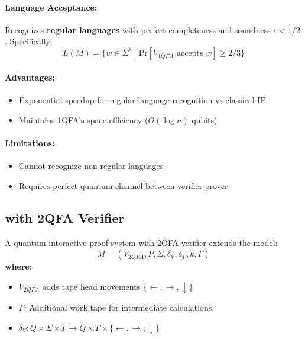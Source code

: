 \paragraph{Language Acceptance:}
Recognizes \textbf{regular languages} with perfect completeness and soundness $\epsilon < 1/2$ \cite{yakaryilmaz2013verification}. Specifically:
\[
L(M) = \{w \in \Sigma^* \mid \text{Pr}[V_{1QFA} \text{ accepts } w] \geq 2/3\}
\]

\paragraph{Advantages:}
\begin{itemize}
    \item Exponential speedup for regular language recognition vs classical IP
    \item Maintains 1QFA's space efficiency ($O(\log n)$ qubits)
\end{itemize}

\paragraph{Limitations:}
\begin{itemize}
    \item Cannot recognize non-regular languages
    \item Requires perfect quantum channel between verifier-prover
\end{itemize}

\subsection{ with 2QFA Verifier}
\label{subsec:qip2qfa}

\begin{definition}
A quantum interactive proof system with 2QFA verifier extends the model:
\[
M = (V_{2QFA}, P, \Sigma, \delta_V, \delta_P, k, \Gamma)
\]
\textbf{where:}
\begin{itemize}
    \item $V_{2QFA}$ adds tape head movements $\{\leftarrow, \rightarrow, \downarrow\}$
    \item $\Gamma$: Additional work tape for intermediate calculations
    \item $\delta_V: Q \times \Sigma \times \Gamma \rightarrow Q \times \Gamma \times \{\leftarrow, \rightarrow, \downarrow\}$
\end{itemize}
\end{definition}

